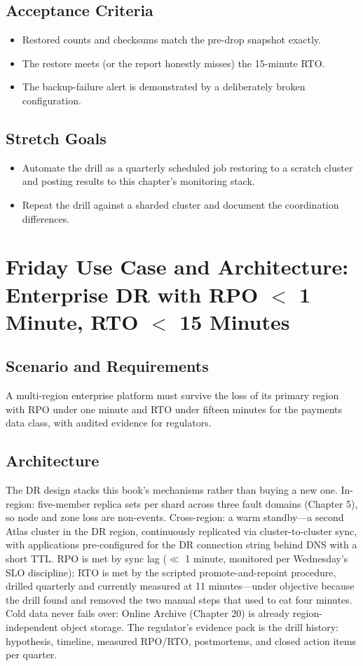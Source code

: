 \subsection*{Acceptance Criteria}
\begin{itemize}
    \item Restored counts and checksums match the pre-drop snapshot exactly.
    \item The restore meets (or the report honestly misses) the 15-minute RTO.
    \item The backup-failure alert is demonstrated by a deliberately broken configuration.
\end{itemize}

\subsection*{Stretch Goals}
\begin{itemize}
    \item Automate the drill as a quarterly scheduled job restoring to a scratch cluster and posting results to this chapter's monitoring stack.
    \item Repeat the drill against a sharded cluster and document the coordination differences.
\end{itemize}
\section{Friday Use Case and Architecture: Enterprise DR with RPO $<$ 1 Minute, RTO $<$ 15 Minutes}
\subsection{Scenario and Requirements}
A multi-region enterprise platform must survive the loss of its primary region with RPO under one minute and RTO under fifteen minutes for the payments data class, with audited evidence for regulators.

\subsection{Architecture}
The DR design stacks this book's mechanisms rather than buying a new one. In-region: five-member replica sets per shard across three fault domains (Chapter 5), so node and zone loss are non-events. Cross-region: a warm standby---a second Atlas cluster in the DR region, continuously replicated via cluster-to-cluster sync, with applications pre-configured for the DR connection string behind DNS with a short TTL. RPO is met by sync lag ($\ll$ 1 minute, monitored per Wednesday's SLO discipline); RTO is met by the scripted promote-and-repoint procedure, drilled quarterly and currently measured at 11 minutes---under objective because the drill found and removed the two manual steps that used to eat four minutes. Cold data never fails over: Online Archive (Chapter 20) is already region-independent object storage. The regulator's evidence pack is the drill history: hypothesis, timeline, measured RPO/RTO, postmortems, and closed action items per quarter.

